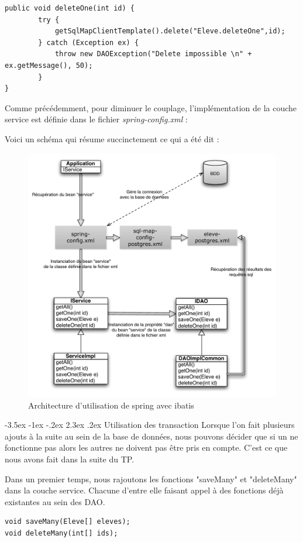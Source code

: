 \documentclass[a4paper,12pt]{article}
\makeatletter
\renewcommand\section{\@startsection {section}{1}{\z@}%
                           {-3.5ex \@plus -1ex \@minus -.2ex}%
                           {2.3ex \@plus.2ex}%
                           {\normalfont\Large\bfseries}}
\makeatother
\begin{document}
\begin{lstlisting}
public void deleteOne(int id) {
		try {
			getSqlMapClientTemplate().delete("Eleve.deleteOne",id);
		} catch (Exception ex) {
			throw new DAOException("Delete impossible \n" + ex.getMessage(), 50);
		}
}
\end{lstlisting}

Comme précédemment, pour diminuer le couplage, l'implémentation de la couche service est définie dans le fichier \textit{spring-config.xml} :

Voici un schéma qui résume succinctement ce qui a été dit :

\begin{figure}[H]
	\center
	\includegraphics[width=15cm]{img/springibatis.pdf}
	\caption{Architecture d'utilisation de spring avec ibatis}
\end{figure}

\newpage
\section{Utilisation des transaction}
Lorsque l'on fait plusieurs ajouts à la suite au sein de la base de données, nous pouvons décider que si un ne fonctionne pas 
alors les autres ne doivent pas être pris en compte. C'est ce que nous avons fait dans la suite du TP.

Dans un premier temps, nous rajoutons les fonctions "saveMany" et "deleteMany" dans la couche service. Chacune d'entre elle faisant appel 
à des fonctions déjà existantes au sein des DAO.
\begin{lstlisting}
void saveMany(Eleve[] eleves);
void deleteMany(int[] ids);
\end{lstlisting}
\end{document}
